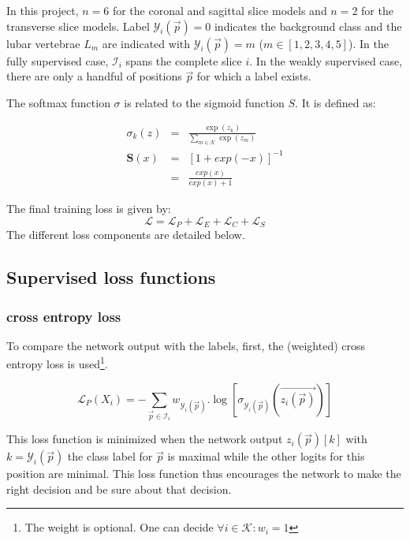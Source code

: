 In this project, $n=6$ for the coronal and sagittal slice models and $n=2$ for the transverse slice models. 
Label $\mathcal{Y}_i(\vec{p})=0$ indicates the background class and the lubar vertebrae $L_m$ are indicated with $\mathcal{Y}_i(\vec{p})=m$ ($m\in[1,2,3,4,5]$).
In the fully supervised case, $\mathcal{I}_i$ spans the complete slice $i$. In the weakly supervised case, there are only a handful of positions $\vec{p}$ for which a label exists.

The softmax function $\sigma$ is related to the sigmoid function $S$. It is defined as:

\begin{eqnarray}
    \sigma_k(z) &=& \frac{\exp(z_k)}{\sum_{m\in\mathcal{K}} \exp(z_m)} \\
    \mathbf{S}(x) &=& \left[ 1+ exp(-x) \right]^{-1} \\ &=& \frac{exp(x)}{exp(x) + 1} 
\end{eqnarray}

The final training loss is given by:
\begin{equation}
    \mathcal{L} = \mathcal{L}_P + \mathcal{L}_E + \mathcal{L}_C + \mathcal{L}_S
\end{equation}
The different loss components are detailed below.

\subsection{Supervised loss functions}

\subsubsection{cross entropy loss\label{sec:crossentropy}}
To compare the network output with the labels, first, the (weighted) cross entropy loss is used\footnote{The weight is optional. One can decide $\forall i\in\mathcal{K}: w_i=1$}.

\begin{equation}
\mathcal{L}_P(X_i) = -\sum_{\vec{p} \in \mathcal{I}_i} w_{\mathcal{Y}_i(\vec{p})}.\log\left[\sigma_{\mathcal{Y}_i(\vec{p})}\left(\vec{z_i(\vec{p})}\right)\right]
\label{eq:LP}
\end{equation}

This loss function is minimized when the network output $z_i(\vec{p})[k]$ with $k=\mathcal{Y}_i(\vec{p})$ the class label for $\vec{p}$ is maximal while the other logits for this position are minimal.
This loss function thus encourages the network to make the right decision and be sure about that decision.

